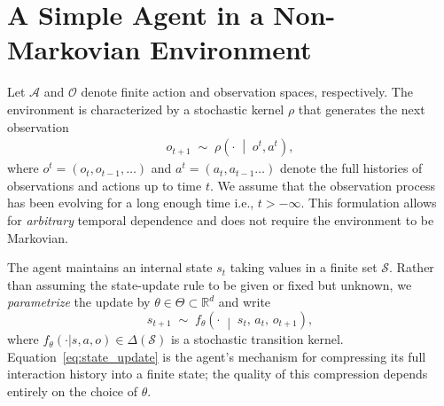 \documentclass[12pt]{article}
\renewcommand{\[}{\left[}
\renewcommand{\]}{\right]}
\renewcommand{\(}{\left(}
\renewcommand{\)}{\right)}
\newcounter{l1}
\newcounter{l2}
\newcounter{l3}
\begin{document}
\section{A Simple Agent in a Non-Markovian Environment}
\label{sec:setup}

Let $\mathcal{A}$ and $\mathcal{O}$ denote finite action and observation spaces,
respectively. The environment is characterized by a stochastic kernel $\rho$ that
generates the next observation
\begin{align*}
    o_{t+1} \;\sim\; \rho\!\left(\cdot \;\middle|\; o^t, a^t\right),
\end{align*}
where $o^t = (o_t,o_{t-1},\dots)$ and $a^t = (a_t, a_{t-1}\dots)$ denote the full histories of
observations and actions up to time $t$. {We assume that the observation process has been evolving for a long enough time i.e., $t>-\infty$. } This formulation allows for \emph{arbitrary}
temporal dependence and does not require the environment to be Markovian.

The agent maintains an internal state $s_t$ taking values in a finite set $\mathcal{S}$.
Rather than assuming the state-update rule to be given or fixed but unknown, we
\emph{parametrize} the update by $\theta \in \Theta \subset \mathbb{R}^d$ and write
\begin{equation}\label{eq:state_update}
  s_{t+1} \;\sim\; f_\theta\!\left(\cdot \;\middle|\; s_t,\, a_t,\, o_{t+1}\right),
\end{equation}
where $f_\theta(\cdot|s,a,o) \in \Delta(\mathcal{S})$ is a stochastic transition kernel.
Equation~\eqref{eq:state_update} is the agent's mechanism for compressing its full
interaction history into a finite state; the quality of this compression depends
entirely on the choice of $\theta$.
\end{document}
